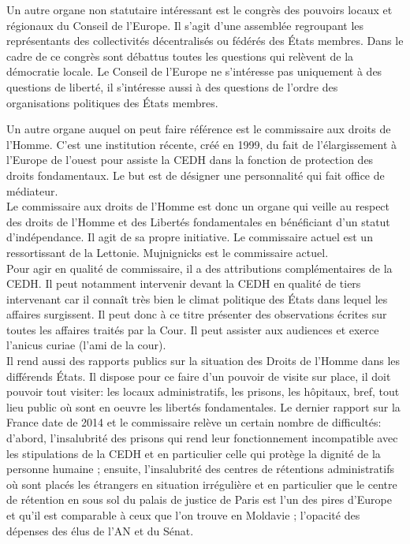 \documentclass[10pt, a4paper, openany]{book}
\begin{document}
Un autre organe non statutaire intéressant est le congrès des pouvoirs locaux et régionaux du Conseil de l'Europe. Il s'agit d'une assemblée regroupant les représentants des collectivités décentralisés ou fédérés des États membres. Dans le cadre de ce congrès sont débattus toutes les questions qui relèvent de la démocratie locale. Le Conseil de l'Europe ne s'intéresse pas uniquement à des questions de liberté, il s'intéresse aussi à des questions de l'ordre des organisations politiques des États membres.


Un autre organe auquel on peut faire référence est le commissaire aux droits de l'Homme. C'est une institution récente, créé en 1999, du fait de l'élargissement à l'Europe de l'ouest pour assiste la CEDH dans la fonction de protection des droits fondamentaux. Le but est de désigner une personnalité qui fait office de médiateur. \\
Le commissaire aux droits de l'Homme est donc un organe qui veille au respect des droits de l'Homme et des Libertés fondamentales en bénéficiant d'un statut d'indépendance. Il agit de sa propre initiative. Le commissaire actuel est un ressortissant de la Lettonie. Mujnignicks est le commissaire actuel. \\
Pour agir en qualité de commissaire, il a des attributions complémentaires de la CEDH. Il peut notamment intervenir devant la CEDH en qualité de tiers intervenant car il connaît très bien le climat politique des États dans lequel les affaires surgissent. Il peut donc à ce titre présenter des observations écrites sur toutes les affaires traités par la Cour. Il peut assister aux audiences et exerce l'anicus curiae (l'ami de la cour). \\
Il rend aussi des rapports publics sur la situation des Droits de l'Homme dans les différends États. Il dispose pour ce faire d'un pouvoir de visite sur place, il doit pouvoir tout visiter: les locaux administratifs, les prisons, les hôpitaux, bref, tout lieu public où sont en oeuvre les libertés fondamentales. Le dernier rapport sur la France date de 2014 et le commissaire relève un certain nombre de difficultés: d'abord, l'insalubrité des prisons qui rend leur fonctionnement incompatible avec les stipulations de la CEDH et en particulier celle qui protège la dignité de la personne humaine ; ensuite, l'insalubrité des centres de rétentions administratifs où sont placés les étrangers en situation irrégulière et en particulier que le centre de rétention en sous sol du palais de justice de Paris est l'un des pires d'Europe et qu'il est comparable à ceux que l'on trouve en Moldavie ; l'opacité des dépenses des élus de l'AN et du Sénat. 
\end{document}
